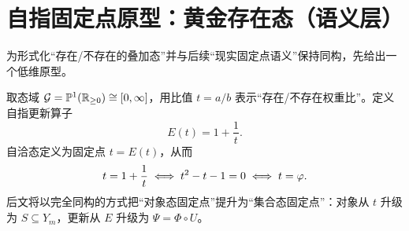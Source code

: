 \section{自指固定点原型：黄金存在态（语义层）}

为形式化“存在/不存在的叠加态”并与后续“现实固定点语义”保持同构，先给出一个低维原型。

取态域 $\mathcal{G}=\mathbb{P}^{1}(\mathbb{R}_{\ge 0})\cong[0,\infty]$，用比值 $t=a/b$ 表示“存在/不存在权重比”。定义自指更新算子
\[
E(t)=1+\frac{1}{t}.
\]
自洽态定义为固定点 $t=E(t)$，从而
\[
t=1+\frac{1}{t}\iff t^2-t-1=0\iff t=\varphi.
\]
后文将以完全同构的方式把“对象态固定点”提升为“集合态固定点”：对象从 $t$ 升级为 $S\subseteq Y_m$，更新从 $E$ 升级为 $\Psi=\Phi\circ U$。

